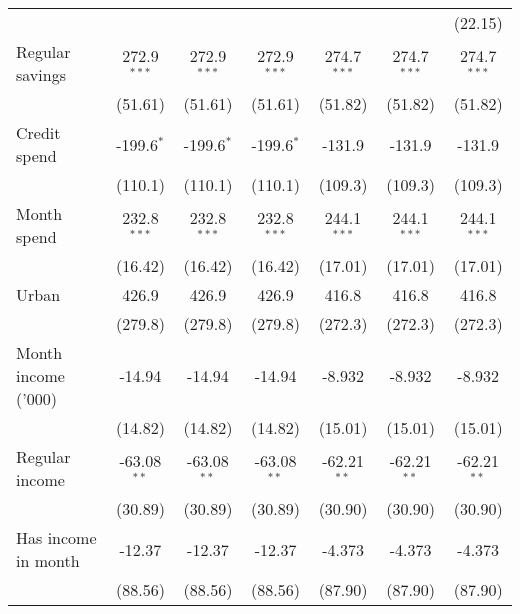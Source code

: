 \begin{table}[htbp]
\begin{footnotesize}
\begin{tabular}{lcccccc}
                                          &                &                &                &                &                 & (22.15)\\
         Regular savings                  & 272.9$^{***}$  & 272.9$^{***}$  & 272.9$^{***}$  & 274.7$^{***}$  & 274.7$^{***}$   & 274.7$^{***}$\\
                                          & (51.61)        & (51.61)        & (51.61)        & (51.82)        & (51.82)         & (51.82)\\
         Credit spend                     & -199.6$^{*}$   & -199.6$^{*}$   & -199.6$^{*}$   & -131.9         & -131.9          & -131.9\\
                                          & (110.1)        & (110.1)        & (110.1)        & (109.3)        & (109.3)         & (109.3)\\
         Month spend                      & 232.8$^{***}$  & 232.8$^{***}$  & 232.8$^{***}$  & 244.1$^{***}$  & 244.1$^{***}$   & 244.1$^{***}$\\
                                          & (16.42)        & (16.42)        & (16.42)        & (17.01)        & (17.01)         & (17.01)\\
         Urban                            & 426.9          & 426.9          & 426.9          & 416.8          & 416.8           & 416.8\\
                                          & (279.8)        & (279.8)        & (279.8)        & (272.3)        & (272.3)         & (272.3)\\
         Month income ('000)              & -14.94         & -14.94         & -14.94         & -8.932         & -8.932          & -8.932\\
                                          & (14.82)        & (14.82)        & (14.82)        & (15.01)        & (15.01)         & (15.01)\\
         Regular income                   & -63.08$^{**}$  & -63.08$^{**}$  & -63.08$^{**}$  & -62.21$^{**}$  & -62.21$^{**}$   & -62.21$^{**}$\\
                                          & (30.89)        & (30.89)        & (30.89)        & (30.90)        & (30.90)         & (30.90)\\
         Has income in month              & -12.37         & -12.37         & -12.37         & -4.373         & -4.373          & -4.373\\
                                          & (88.56)        & (88.56)        & (88.56)        & (87.90)        & (87.90)         & (87.90)\\

\end{tabular}
\end{footnotesize}
\end{table}
